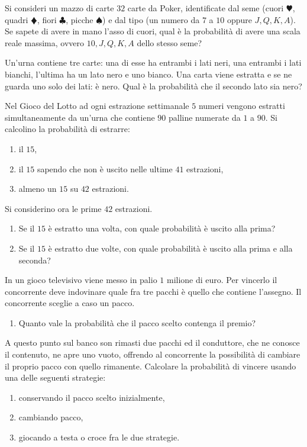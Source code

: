 Si consideri un mazzo di carte $32$ carte da Poker, identificate dal seme (cuori $\varheartsuit $, quadri $\vardiamondsuit $, fiori $\clubsuit $, picche $\spadesuit $) e dal tipo (un numero da $7$ a $10$ oppure $J,Q,K,A$). Se sapete di avere in mano l'asso di cuori, qual è la probabilità di avere una scala reale massima, ovvero $10,J,Q,K,A$ dello stesso seme?
\Esercizio{}

Un'urna contiene tre carte: una di esse ha entrambi i lati neri, una entrambi i lati bianchi, l'ultima ha un lato nero e uno bianco. Una carta viene estratta e se ne guarda uno solo dei lati: è nero. Qual è la probabilità che il secondo lato sia nero?
\Esercizio{}

Nel Gioco del Lotto ad ogni estrazione settimanale $5$ numeri vengono estratti simultaneamente da un'urna che contiene $90$ palline numerate da $1$ a $90$. Si calcolino la probabilità di estrarre:
\begin{enumerate}
\item il $15$,
\item il $15$ sapendo che non è uscito nelle ultime $41$ estrazioni,
\item almeno un $15$ su $42$ estrazioni.
\end{enumerate}

Si considerino ora le prime $42$ estrazioni.
\begin{enumerate}
\item Se il $15$ è estratto una volta, con quale probabilità è uscito alla prima?
\item Se il $15$ è estratto due volte, con quale probabilità è uscito alla prima e alla seconda?
\end{enumerate}

In un gioco televisivo viene messo in palio $1$ milione di euro. Per vincerlo il concorrente deve indovinare quale fra tre pacchi è quello che contiene l'assegno. Il concorrente sceglie a caso un pacco.
\begin{enumerate}
\item Quanto vale la probabilità che il pacco scelto contenga il premio?
\end{enumerate}

A questo punto sul banco son rimasti due pacchi ed il conduttore, che ne conosce il contenuto, ne apre uno vuoto, offrendo al concorrente la possibilità di cambiare il proprio pacco con quello rimanente. Calcolare la probabilità di vincere usando una delle seguenti strategie:
\begin{enumerate}
\item conservando il pacco scelto inizialmente,
\item cambiando pacco,
\item giocando a testa o croce fra le due strategie.
\end{enumerate}

